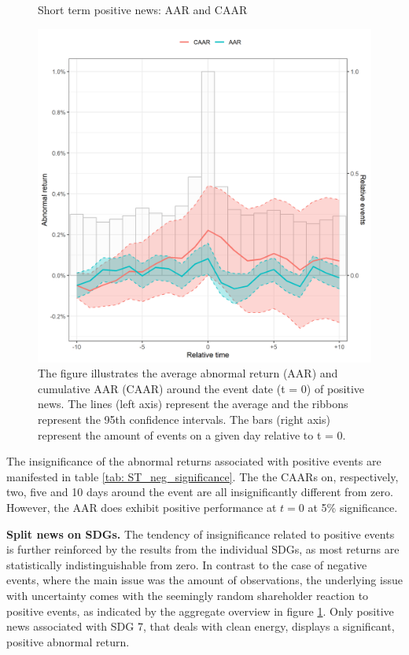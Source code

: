 \begin{figure} [H] 
    \centering
    \caption{Short term positive news: AAR and CAAR}
    \includegraphics[scale=0.6]{Projekt/1.Figures analysis/ST_positive_all_CI.png}
    \caption*{\footnotesize The figure illustrates the average abnormal return (AAR) and cumulative AAR (CAAR) around the event date (t = 0) of positive news. The lines (left axis) represent the average and the ribbons represent the 95th confidence intervals. The bars (right axis) represent the amount of events on a given day relative to t = 0. }
    \label{fig:ST_pos_news}
\end{figure}

The insignificance of the abnormal returns associated with positive events are manifested in table \ref{tab: ST_neg_significance}. The the CAARs on, respectively, two, five and 10 days around the event are all insignificantly different from zero. However, the AAR does exhibit positive performance at $t = 0$ at 5\% significance.


\textbf{Split news on SDGs.}
The tendency of insignificance related to positive events is further reinforced by the results from the individual SDGs, as most returns are statistically indistinguishable from zero. In contrast to the case of negative events, where the main issue was the amount of observations, the underlying issue with uncertainty comes with the seemingly random shareholder reaction to positive events, as indicated by the aggregate overview in figure \ref{fig:ST_pos_news}. Only positive news associated with SDG 7, that deals with clean energy, displays a significant, positive abnormal return. 
 


